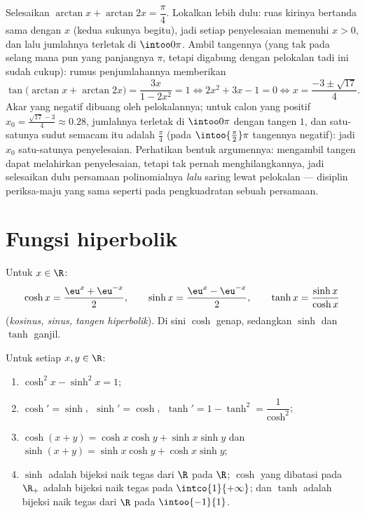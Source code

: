 \begin{example}\label{ex:b1:functions:arctaneq}
Selesaikan $\arctan x + \arctan 2x = \dfrac\pi4$. Lokalkan lebih dulu:
ruas kirinya bertanda sama dengan $x$ (kedua sukunya begitu), jadi setiap penyelesaian
memenuhi $x > 0$, dan lalu jumlahnya terletak di $\intoo0\pi$. Ambil tangennya
(yang tak  pada selang mana pun yang panjangnya $\pi$, tetapi digabung dengan
pelokalan tadi ini sudah cukup): rumus penjumlahannya memberikan
\[
\tan\bigl(\arctan x + \arctan 2x\bigr)
= \frac{3x}{1 - 2x^2} = 1
\iff 2x^2 + 3x - 1 = 0
\iff x = \frac{-3 \pm \sqrt{17}}4 .
\]
Akar yang negatif dibuang oleh pelokalannya; untuk calon yang
positif $x_0 = \frac{\sqrt{17} - 3}4 \approx 0.28$,
jumlahnya terletak di $\intoo0\pi$ dengan tangen $1$, dan satu-satunya
sudut semacam itu adalah $\frac\pi4$ (pada $\intoo{\frac\pi2}\pi$ tangennya
negatif): jadi $x_0$ satu-satunya penyelesaian. Perhatikan bentuk
argumennya: mengambil tangen dapat melahirkan penyelesaian, tetapi tak pernah menghilangkannya,
jadi selesaikan dulu persamaan polinomialnya \emph{lalu} saring lewat
pelokalan --- disiplin periksa-maju yang sama seperti pada pengkuadratan
sebuah persamaan.
\end{example}

\section{Fungsi hiperbolik}

\begin{definition}[$\cosh$, $\sinh$, $\tanh$]\label{def:b1:functions:hyperbolic}
Untuk $x \in \R$:
\[
\cosh x = \frac{\eu^x + \eu^{-x}}{2},
\qquad
\sinh x = \frac{\eu^x - \eu^{-x}}{2},
\qquad
\tanh x = \frac{\sinh x}{\cosh x}
\]
(\emph{kosinus, sinus, tangen hiperbolik}). Di sini $\cosh$ genap, sedangkan $\sinh$ dan $\tanh$ ganjil.
\end{definition}

\begin{proposition}\label{prop:b1:functions:hyprules}
Untuk setiap $x, y \in \R$:
\begin{enumerate}
  \item $\cosh^2 x - \sinh^2 x = 1$;
  \item $\cosh' = \sinh$, $\;\sinh' = \cosh$, $\;\tanh' = 1 - \tanh^2
        = \dfrac{1}{\cosh^2}$;
  \item $\cosh(x+y) = \cosh x\cosh y + \sinh x \sinh y$ dan
        $\sinh(x+y) = \sinh x \cosh y + \cosh x \sinh y$;
  \item $\sinh$ adalah bijeksi naik tegas dari $\R$ pada $\R$;
        $\cosh$ yang dibatasi pada $\R_+$ adalah bijeksi naik
        tegas pada $\intco{1}{+\infty}$; dan $\tanh$ adalah bijeksi naik
        tegas dari $\R$ pada $\intoo{-1}{1}$.
\end{enumerate}
\end{proposition}

